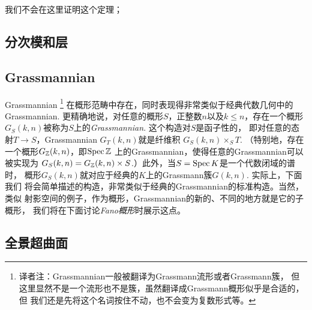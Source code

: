 我们不会在这里证明这个定理；\nottran

\subsection{分次模和层} \label{s:3.2.6}

\subsection{Grassmannian} \label{s:3.2.7}

Grassmannian%
\footnote{译者注：Grassmannian一般被翻译为Grassmann流形或者Grassmann簇，
但这里显然不是一个流形也不是簇，虽然翻译成Grassmann概形似乎是合适的，但
我们还是先将这个名词按住不动，也不会变为复数形式等。}%
在概形范畴中存在，同时表现得非常类似于经典代数几何中的Grassmannian.
更精确地说，对任意的概形$S$，正整数$n$以及$k\leq n$，存在一个概形
$G_S(k,n)$被称为$S$上的\textit{Grassmannian}. 这个构造对$S$是函子性的，
即对任意的态射$T\to S$，Grassmannian $G_T(k,n)$就是纤维积
$G_S(k,n)\times_S T$. （特别地，存在一个概形$G_{\mathbb{Z}}(k,n)$，即$\operatorname{Spec} \mathbb{Z}$
上的Grassmannian，使得任意的Grassmannian可以被实现为
$G_S(k,n)=G_{\mathbb{Z}}(k,n)\times S$.）此外，当$S=\operatorname{Spec} K$是一个代数闭域的谱时，
概形$G_S(k,n)$就对应于经典的$K$上的Grassmann簇$G(k,n)$. 实际上，下面我们
将会简单描述的构造，非常类似于经典的Grassmannian的标准构造。当然，类似
射影空间的例子，作为概形，Grassmannian的新的、不同的地方就是它的子概形，
我们将在下面讨论\textit{Fano概形}时展示这点。

\subsection{全景超曲面} \label{s:3.2.8}
